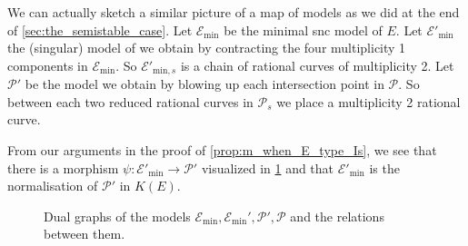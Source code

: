 We can actually sketch a similar picture of a map of models as we did at the end of \cref{sec:the_semistable_case}. 
Let $\mathscr E_\text{min} $ be the minimal snc model of $E$. 
Let $\mathscr E'_{\text{min}}$ the (singular) model of we obtain by contracting the four multiplicity 1 components in  $\mathscr E_\text{min} $. 
So $\mathscr E'_{\text{min}, s} $ is a chain of rational curves of multiplicity 2. 
Let $\mathscr P'$ be the model we obtain by blowing up each intersection point in $\mathscr P$. 
So between each two reduced rational curves in $\mathscr P_s$ we place a multiplicity 2 rational curve.

From our arguments in the proof of \cref{prop:m_when_E_type_Is}, we see that there is a morphism $\psi: \mathscr E'_\text{min}  \to \mathscr P'$ visualized in \cref{fig:dualgraphs_is_models} and that $\mathscr E'_\text{min} $ is the normalisation of $\mathscr P'$ in  $K(E)$. 
\begin{figure}[ht]
    \centering
    \caption{Dual graphs of the models $\mathscr E_\text{min} , \mathscr E_\text{min} ', \mathscr P', \mathscr P$ and the relations between them.}
    \label{fig:dualgraphs_is_models}
\end{figure}

